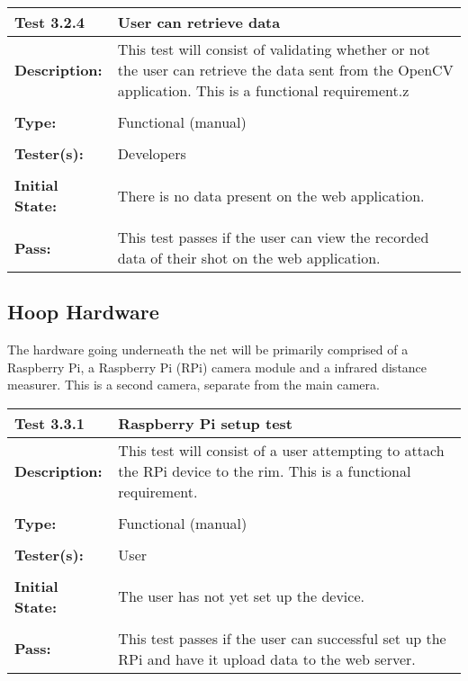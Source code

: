 \documentclass{article}
\begin{document}
\begin{tabularx}{\textwidth}{p{2cm}p{9cm}}
\toprule 
{\bf Test 3.2.4 } & {\bf User can retrieve data}\\
\midrule
\textbf{Description:} & This test will consist of validating whether or not the user can retrieve the data sent from the OpenCV application. This is a functional requirement.z\\[0.3\baselineskip]
                      &                     \\
\textbf{Type:} & Functional (manual)   \\[0.3\baselineskip]
                      &                     \\
\textbf{Tester(s):} & Developers \\[0.3\baselineskip]
                      &                     \\
\textbf{Initial State:} & There is no data present on the web application. \\[0.3\baselineskip]
                      &                     \\
\textbf{Pass:} & This test passes if the user can view the recorded data of their shot on the web application. \\[0.3\baselineskip]
\bottomrule
\end{tabularx}



\newpage
\subsection {Hoop Hardware}
The hardware going underneath the net will be primarily comprised of a Raspberry Pi, a Raspberry Pi (RPi) camera module and a infrared distance measurer. This is a second camera, separate from the main camera.

\begin{tabularx}{\textwidth}{p{2cm}p{9cm}}
\toprule 
{\bf Test 3.3.1} & {\bf Raspberry Pi setup test}\\
\midrule
\textbf{Description:} & This test will consist of a user attempting to attach the RPi device to the rim.  This is a functional requirement. \\[0.3\baselineskip]
                      &                     \\
\textbf{Type:} & Functional (manual)   \\[0.3\baselineskip]
                      &                     \\
\textbf{Tester(s):} & User \\[0.3\baselineskip]
                      &                     \\
\textbf{Initial State:} & The user has not yet set up the device. \\[0.3\baselineskip]
                      &                     \\
\textbf{Pass:} & This test passes if the user can successful set up the RPi and have it upload data to the web server.  \\[0.3\baselineskip]
\end{tabularx}
\end{document}
